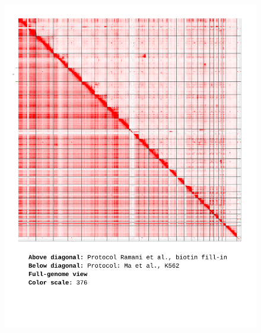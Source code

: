 \documentclass[a4paper,14pt]{extarticle}
\begin{document}
\begin{figure}[hp!] \includegraphics[width=1\textwidth]{s5_s30_ALL_376.pdf} \end{figure}
\end{document}
